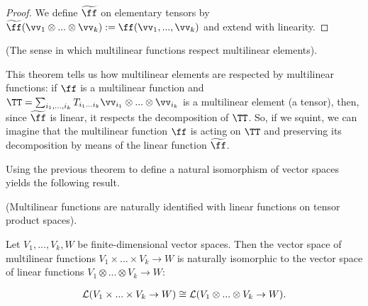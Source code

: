 \begin{proof}
    We define $\widetilde{\ff}$ on elementary tensors by $\widetilde{\ff}(\vv_1 \otimes ... \otimes \vv_k) := \ff(\vv_1, ..., \vv_k)$ and extend with linearity.
\end{proof}

\begin{remark}
    (The sense in which multilinear functions respect multilinear elements).
        
   This theorem tells us how multilinear elements are respected by multilinear functions: if $\ff$ is a multilinear function and $\TT = \sum_{i_1, ..., i_k} T_{i_1 ... i_k} \vv_{i_1} \otimes ... \otimes \vv_{i_k}$ is a multilinear element (a tensor), then, since $\widetilde{\ff}$ is linear, it respects the decomposition of $\TT$. So, if we squint, we can imagine that the multilinear function $\ff$ is acting on $\TT$ and preserving its decomposition by means of the linear function $\widetilde{\ff}$.
\end{remark}

Using the previous theorem to define a natural isomorphism of vector spaces yields the following result.

\begin{theorem}
\label{ch::motivated_intro::thm::multilin_fns_iso_lin_fns}
    (Multilinear functions are naturally identified with linear functions on tensor product spaces).
    
    Let $V_1, ..., V_k, W$ be finite-dimensional vector spaces. Then the vector space of multilinear functions ${V_1 \times ... \times V_k \rightarrow W}$ is naturally isomorphic to the vector space of linear functions ${V_1 \otimes ... \otimes V_k \rightarrow W}$:
    
    \begin{align*}
        \mathcal{L}(V_1 \times ... \times V_k \rightarrow W) \cong \mathcal{L}(V_1 \otimes ... \otimes V_k \rightarrow W).
    \end{align*}
\end{theorem}

